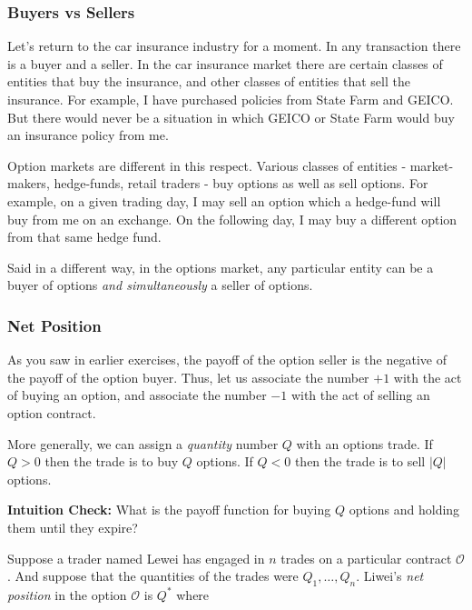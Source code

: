 \documentclass[11pt,]{krantz}
\begin{document}
\subsubsection*{Buyers vs Sellers}\label{buyers-vs-sellers}

Let's return to the car insurance industry for a moment. In any transaction there is a buyer and a seller. In the car insurance market there are certain classes of entities that buy the insurance, and other classes of entities that sell the insurance. For example, I have purchased policies from State Farm and GEICO. But there would never be a situation in which GEICO or State Farm would buy an insurance policy from me.

Option markets are different in this respect. Various classes of entities - market-makers, hedge-funds, retail traders - buy options as well as sell options. For example, on a given trading day, I may sell an option which a hedge-fund will buy from me on an exchange. On the following day, I may buy a different option from that same hedge fund.

Said in a different way, in the options market, any particular entity can be a buyer of options \emph{and simultaneously} a seller of options.

\subsubsection*{Net Position}\label{net-position}

As you saw in earlier exercises, the payoff of the option seller is the negative of the payoff of the option buyer. Thus, let us associate the number \(+1\) with the act of buying an option, and associate the number \(-1\) with the act of selling an option contract.

More generally, we can assign a \emph{quantity} number \(Q\) with an options trade. If \(Q > 0\) then the trade is to buy \(Q\) options. If \(Q < 0\) then the trade is to sell \(|Q|\) options.

\textbf{Intuition Check:} What is the payoff function for buying \(Q\) options and holding them until they expire?

Suppose a trader named Lewei has engaged in \(n\) trades on a particular contract \(\mathcal{O}\). And suppose that the quantities of the trades were \(Q_{1}, \ldots, Q_{n}\). Liwei's \emph{net position} in the option \(\mathcal{O}\) is \(Q^{*}\) where
\end{document}
